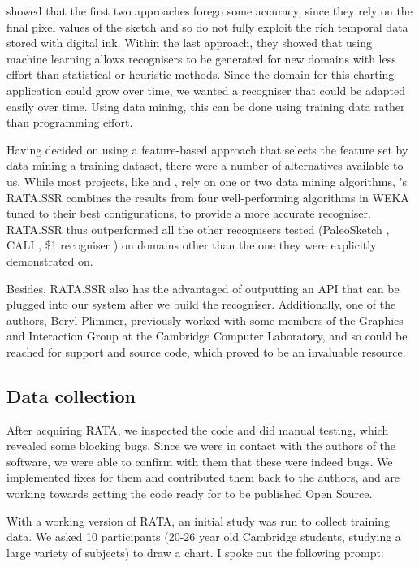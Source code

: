 	\citep{chang_rata._2010} showed that the first two approaches forego some accuracy, since they rely on the final pixel values of the sketch and so do not fully exploit the rich temporal data stored with digital ink. Within the last approach, they showed that using machine learning allows recognisers to be generated for new domains with less effort than statistical or heuristic methods. Since the domain for this charting application could grow over time, we wanted a recogniser that could be adapted easily over time. Using data mining, this can be done using training data rather than programming effort.
	
	Having decided on using a feature-based approach that selects the feature set by data mining a training dataset, there were a number of alternatives available to us. While most projects, like \citep{rubine_specifying_1991} and \citep{willems_iconic_2009}, rely on one or two data mining algorithms, \citep{chang_rata._2010}'s RATA.SSR combines the results from four well-performing algorithms in WEKA \citep{hall_weka_2009} tuned to their best configurations, to provide a more accurate recogniser. RATA.SSR thus outperformed all the other recognisers tested (PaleoSketch \citep{paulson_paleosketch:_2008}, CALI \citep{fonseca_cali:_2002}, \$1 recogniser \citep{wobbrock_gestures_2007}) on domains other than the one they were explicitly demonstrated on. 
	
	Besides, RATA.SSR also has the advantaged of outputting an API that can be plugged into our system after we build the recogniser. Additionally, one of the authors, Beryl Plimmer, previously worked with some members of the Graphics and Interaction Group at the Cambridge Computer Laboratory, and so could be reached for support and source code, which proved to be an invaluable resource.
	
	\subsection{Data collection}
	After acquiring RATA, we inspected the code and did manual testing, which revealed some blocking bugs. Since we were in contact with the authors of the software, we were able to confirm with them that these were indeed bugs. We implemented fixes for them and contributed them back to the authors, and are working towards getting the code ready for to be published Open Source.
	
	With a working version of RATA, an initial study was run to collect training data. We asked 10 participants (20-26 year old Cambridge students, studying a large variety of subjects) to draw a chart. I spoke out the following prompt:
	
